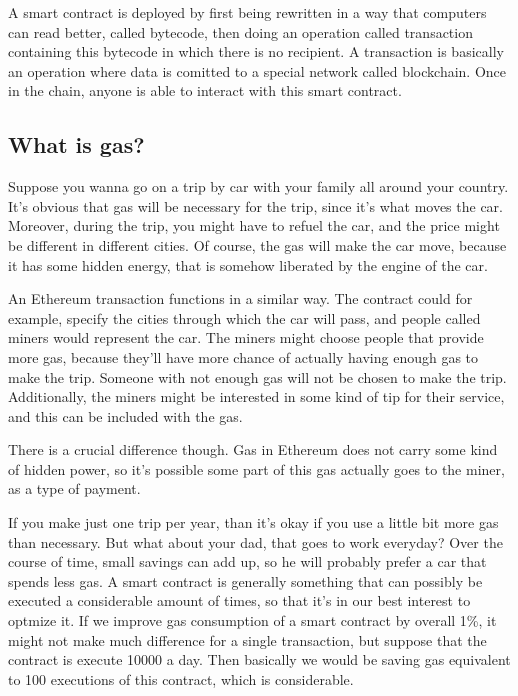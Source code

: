 \documentclass{article}
\begin{document}
A smart contract is deployed by first being rewritten in a way that computers can read better, called bytecode, then doing an operation called transaction containing this bytecode in which there is no recipient. A transaction is basically an operation where data is comitted to a special network called blockchain. Once in the chain, anyone is able to interact with this smart contract.

\subsection*{What is gas?}

Suppose you wanna go on a trip by car with your family all around your country. It's obvious that gas will be necessary for the trip, since it's what moves the car. Moreover, during the trip, you might have to refuel the car, and the price might be different in different cities. Of course, the gas will make the car move, because it has some hidden energy, that is somehow liberated by the engine of the car.

An Ethereum transaction functions in a similar way. The contract could for example, specify the cities through which the car will pass, and people called miners would represent the car. The miners might choose people that provide more gas, because they'll have more chance of actually having enough gas to make the trip. Someone with not enough gas will not be chosen to make the trip. Additionally, the miners might be interested in some kind of tip for their service, and this can be included with the gas.

There is a crucial difference though. Gas in Ethereum does not carry some kind of hidden power, so it's possible some part of this gas actually goes to the miner, as a type of payment.

If you make just one trip per year, than it's okay if you use a little bit more gas than necessary. But what about your dad, that goes to work everyday? Over the course of time, small savings can add up, so he will probably prefer a car that spends less gas. A smart contract is generally something that can possibly be executed a considerable amount of times, so that it's in our best interest to optmize it. If we improve gas consumption of a smart contract by overall 1\%, it might not make much difference for a single transaction, but suppose that the contract is execute 10000 a day. Then basically we would be saving gas equivalent to 100 executions of this contract, which is considerable. 
\end{document}
